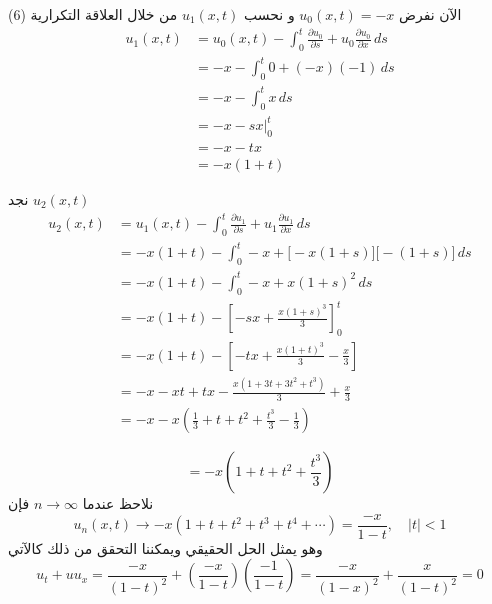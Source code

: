 	\begin{frame}
		\begin{exampleblock}{}
			
			الآن نفرض $u_0(x,t) = -x$ و نحسب $u_1(x, t)$ من خلال العلاقة التكرارية (6)
			\begin{align*}
				u_1(x, t) &= u_0(x, t) - \int_{0}^t \frac{\partial u_0}{\partial s} + u_0 \frac{\partial u_0}{\partial x} \, ds\\
				&= -x - \int_{0}^t 0 + (-x)(-1) \, ds\\
				&= -x - \int_{0}^t x \, ds\\
				&= -x - sx \Big|_0^t\\
				&= -x -tx\\
				&= -x(1+t)
			\end{align*}
		\end{exampleblock}
	\end{frame}
	
	\begin{frame}
		\begin{exampleblock}{}
						نجد $u_2(x, t)$
			\begin{align*}
				u_2(x, t) &= u_1(x, t) - \int_{0}^t \frac{\partial u_1}{\partial s} + u_1 \frac{\partial u_1}{\partial x} \, ds\\
				&= -x(1+t) - \int_{0}^t -x + \big[-x(1+s)\big]\big[-(1+s)\big]\, ds\\
				&= -x(1+t) - \int_{0}^t -x + x(1+s)^2\, ds\\
				&= -x(1+t) - \left[-sx + \frac{x(1+s)^3}{3}\right]_0^t\\
				&= -x(1+t) - \left[-tx + \frac{x(1+t)^3}{3} - \frac{x}{3}\right]\\
				&= -x -xt + tx - \frac{x(1+3t + 3t^2 + t^3)}{3} + \frac{x}{3}\\
				&= -x - x \left(\frac{1}{3} + t + t^2 + \frac{t^3}{3} - \frac{1}{3}\right)
			\end{align*}

			
		\end{exampleblock}
	\end{frame}
	\abovedisplayskip=7pt
	\belowdisplayskip=7pt
	\begin{frame}
		\begin{exampleblock}{}
		\[
		= -x \left(1+t+t^2 + \frac{t^3}{3}\right)
		\]
					نلاحظ عندما $n \to \infty$ فإن 
		\[
		u_n(x ,t) \to -x (1+t+t^2+t^3+t^4 + \cdots) = \frac{-x}{1-t} , \quad |t| < 1
		\]
		وهو يمثل الحل الحقيقي ويمكننا التحقق من ذلك كالآتي
		\[
		u_t + u u_x = \frac{-x}{(1-t)^2} + \left(\frac{-x}{1-t}\right)\left(\frac{-1}{1-t}\right) = \frac{-x}{(1-x)^2} + \frac{x}{(1-t)^2} = 0
		\]
		\end{exampleblock}
	\end{frame}
	

